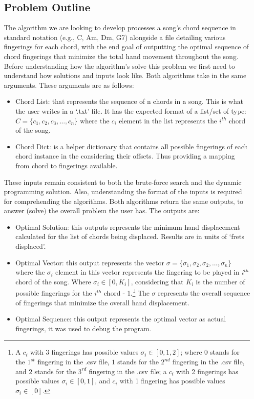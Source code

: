 \documentclass[conference]{IEEEtran}
\begin{document}
\subsection{Problem Outline}
The algorithm we are looking to develop processes a song's chord sequence in standard notation (e.g., C, Am, Dm, G7) alongside a file detailing various fingerings for each chord, with the end goal of outputting the optimal sequence of chord fingerings that minimize the total hand movement throughout the song. Before understanding how the algorithm's solve this problem we first need to understand how solutions and inputs look like.
\newline 
\indent Both algorithms take in the same arguments. These arguments are as follows:
\begin{itemize}
    \item Chord List: that represents the sequence of n chords in a song. This is what the user writes in a `.txt' file. It has the expected format of a list/set of type:
    \( C = \{c_1, c_2, c_3, \dots, c_n\} \) where the \(c_i\) element in the list represents the \(i^{th}\) chord of the song.
    \item Chord Dict: is a helper dictionary that contains all possible fingerings of each chord instance in the considering their offsets. Thus providing a mapping from chord to fingerings available.
\end{itemize}
\indent These inputs remain consistent to both the brute-force search and the dynamic programming solution. Also, understanding the format of the inputs is required for comprehending the algorithms.
\newline
\indent Both algorithms return the same outputs, to answer (solve) the overall problem the user has. The outputs are:
\begin{itemize}
    \item Optimal Solution: this outputs represents the minimum hand displacement calculated for the list of chords being displaced. Results are in units of `frets displaced'.
    \item Optimal Vector: this output represents the vector \(\sigma = \{\sigma_1, \sigma_2, \sigma_2, \ldots, \sigma_n\} \) where the \(\sigma_i\) element in this vector represents the fingering to be played in \(i^{th}\) chord of the song. Where \( \sigma_i \in [0, K_i] \), considering that \( K_i \) is the number of possible fingerings for the \(i^{th}\) chord - 1.\footnote[2]{A \(c_i\) with 3 fingerings has possible values \(\sigma_i \in [0, 1, 2] \); where $0$ stands for the $1^{st}$ fingering in the .csv file, $1$ stands for the $2^{nd}$ fingering in the .csv file, and $2$ stands for the $3^{rd}$ fingering in the .csv file; a \(c_i\) with 2 fingerings has possible values \(\sigma_i \in [0, 1] \), and \(c_i\) with 1 fingering has possible values \(\sigma_i \in [0] \).}
    The \(\sigma\) represents the overall sequence of fingerings that minimize the overall hand displacement. 
    \item Optimal Sequence: this output represents the optimal vector as actual fingerings, it was used to debug the program. 
\end{itemize}
\end{document}
